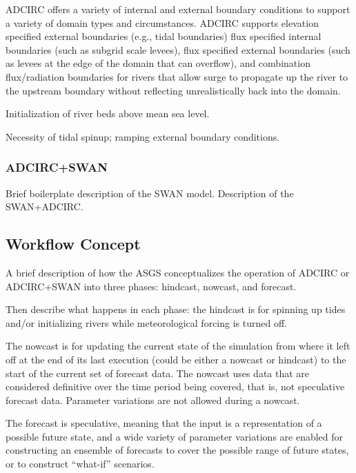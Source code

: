 \documentclass[12pt]{article}
\begin{document}
ADCIRC offers a variety of internal and external boundary conditions 
to support a variety of domain types and circumstances. ADCIRC 
supports elevation specified external boundaries (e.g., tidal 
boundaries) flux specified internal boundaries (such as subgrid 
scale levees), flux specified external boundaries (such as levees at 
the edge of the domain that can overflow), and combination 
flux/radiation boundaries for rivers that allow surge to propagate 
up the river to the upstream boundary without reflecting 
unrealistically back into the domain.

Initialization of river beds above mean sea level. 

Necessity of tidal spinup; ramping external boundary conditions. 

\subsubsection{ADCIRC+SWAN}

Brief boilerplate description of the SWAN model. Description of the SWAN+ADCIRC.

\subsection{Workflow Concept}

A brief description of how the ASGS conceptualizes the operation of 
ADCIRC or ADCIRC+SWAN into three phases: hindcast, nowcast, and 
forecast. 

Then describe what happens in each phase: the hindcast is for 
spinning up tides and/or initializing rivers while meteorological 
forcing is turned off. 

The nowcast is for updating the current state of the simulation from 
where it left off at the end of its last execution (could be either 
a nowcast or hindcast) to the start of the current set of forecast 
data. The nowcast uses data that are considered definitive over the 
time period being covered, that is, not speculative forecast data. 
Parameter variations are not allowed during a nowcast. 

The forecast is speculative, meaning that the input is a representation
of a possible future state, and a wide variety of parameter variations
are enabled for constructing an ensemble of forecasts to cover the possible
range of future states, or to construct ``what-if'' scenarios.
\end{document}

